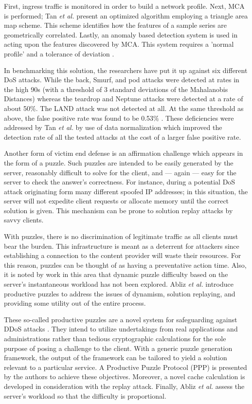 \documentclass[conference]{IEEEtran}
\begin{document}
First, ingress traffic is monitored in order to build a network profile. Next, MCA is performed; Tan \textit{et al.} present an optimized algorithm employing a triangle area map scheme. This scheme identifies how the features of a sample series are geometrically correlated. Lastly, an anomaly based detection system is used in acting upon the features discovered by MCA. This system requires a 'normal profile' and a tolerance of deviation \cite{Tan:MCA}.

In benchmarking this solution, the researchers have put it up against six different DoS attacks. While the back, Smurf, and pod attacks were detected at rates in the high 90s (with a threshold of 3 standard deviations of the Mahalanobis Distances) whereas the teardrop and Neptune attacks were detected at a rate of about 50\%. The LAND attack was not detected at all. At the same threshold as above, the false positive rate was found to be 0.53\% \cite{Tan:MCA}. These deficiencies were addressed by Tan \textit{et al.} by use of data normalization which improved the detection rate of all the tested attacks at the cost of a larger false positive rate.  

Another form of victim end defense is an affirmation challenge which appears in the form of a puzzle. Such puzzles are intended to be easily generated by the server, reasonably difficult to solve for the client, and --- again --- easy for the server to check the answer's correctness. For instance, during a potential DoS attack originating form many different spoofed IP addresses; in this situation, the server will not expedite client requests or allocate memory until the correct solution is given. This mechanism can be prone to solution replay attacks by savvy clients.

With puzzles, there is no discrimination of legitimate traffic as all clients must bear the burden. This infrastructure is meant as a deterrent for attackers since establishing a connection to the content provider will waste their resources. For this reason, puzzles can be thought of as having a preventative action time. Also, it is noted by work in this area that dynamic puzzle difficulty based on the server's instantaneous workload has not been explored. Abliz \textit{et al.} introduce productive puzzles to address the issues of dynamism, solution replaying, and providing some utility out of the entire process. 

These so-called productive puzzles are a novel system for safeguarding against DDoS attacks \cite{Abliz:Puzz}. They intend to utilize undertakings from real applications and administrations rather than tedious cryptographic calculations for the sole purpose of posing a challenge to the client. With a generic puzzle generation framework, the output of the framework can be tailored to yield a solution relevant to a particular service. A Productive Puzzle Protocol (PPP) is presented by the authors to achieve these objectives. Moreover, a novel cache calculation is developed in consideration with the replay attack. Finally, Abliz \textit{et al.} assess the server's workload so that the difficulty is proportional. 
\end{document}
